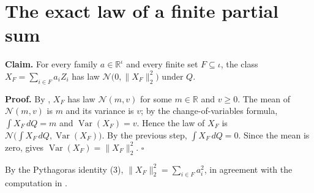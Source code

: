 \documentclass[11pt,a4paper]{article}
\begin{document}
\section{\texorpdfstring{The exact law of a finite partial sum}{The exact law of a finite partial sum}}


\textbf{Claim.} For every family \(a\in\mathbb R^\iota\) and every finite set \(F\subseteq\iota\), the class \(X_F=\sum_{i\in F}a_iZ_i\) has law \(\mathcal N\bigl(0,\|X_F\|_2^2\bigr)\) under \(Q\).




\textbf{Proof.} By \cite[Section~3.6.20]{LangevinLean2026ULASC}, \(X_F\) has law \(\mathcal N(m,v)\) for some \(m\in\mathbb R\) and \(v\ge0\). The mean of \(\mathcal N(m,v)\) is \(m\) and its variance is \(v\); by the change-of-variables formula, \(\int X_F\,dQ=m\) and \(\operatorname{Var}(X_F)=v\). Hence the law of \(X_F\) is \(\mathcal N\bigl(\int X_F\,dQ,\operatorname{Var}(X_F)\bigr)\). By the previous step, \(\int X_F\,dQ=0\). Since the mean is zero, \cite[Section~3.6.18]{LangevinLean2026ULASC} gives \(\operatorname{Var}(X_F)=\|X_F\|_2^2\). \(\square\)




By the Pythagoras identity (3), \(\|X_F\|_2^2=\sum_{i\in F}a_i^2\), in agreement with the computation in \cite[Section~3.6.20]{LangevinLean2026ULASC}.
\end{document}
